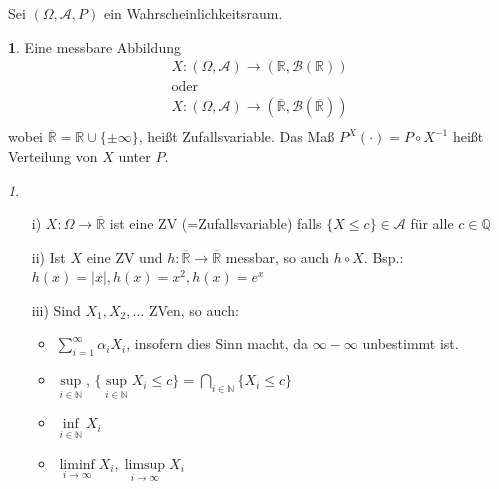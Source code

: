 \documentclass[10pt,a4paper]{report}
\numberwithin{equation}{section}
\numberwithin{figure}{section}
\theoremstyle{plain}
\theoremstyle{definition}
\newtheorem{defn}[thm]{\protect\definitionname}
\theoremstyle{remark}
\newtheorem{rem}[thm]{\protect\remarkname}
\theoremstyle{plain}
\providecommand{\definitionname}{Definition}
\providecommand{\remarkname}{Bemerkung}
\newcommand{\1}{ \mathbb{1} } %
\begin{document}
Sei $(\Omega,\mathcal{A},P)$ ein Wahrscheinlichkeitsraum.
\begin{defn}
  Eine messbare Abbildung
  \begin{eqnarray*}
    X:(\Omega,\mathcal{A}) \to (\mathbb{R},\mathcal{B}(\mathbb{R}))\\
    \text{oder}\\
    X:(\Omega,\mathcal{A}) \to (\overline{\mathbb{R}},\mathcal{B}(\overline{\mathbb{R}}))\\
  \end{eqnarray*}
  wobei $\overline{\mathbb{R}}=\mathbb{R}\cup\{\pm \infty \}$, heißt Zufallsvariable. Das Maß $P^X(\cdot)=P\circ X^{-1}$ heißt Verteilung von $X$ unter $P$.
\end{defn}
\begin{rem}
  \begin{itemize}
  \item[i)] $X: \Omega \to \overline{\mathbb{R}}$ ist eine ZV (=Zufallsvariable) falls $\{X\leq c\} \in \mathcal{A}$ für alle $c \in \mathbb{Q}$
  \item[ii)] Ist $X$ eine ZV und $h:\overline{\mathbb{R}} \to \overline{\mathbb{R}}$ messbar, so auch $h\circ X$. Bsp.:$h(x)=|x|, h(x)=x^2, h(x)=e^x$
  \item[iii)] Sind $X_1,X_2,\dots$ ZVen, so auch:
    \begin{itemize}
    \item $\sum\limits_{i=1}^\infty \alpha_i X_i$, insofern dies Sinn
      macht, da $\infty-\infty$ unbestimmt ist.
    \item $\sup\limits_{i\in \mathbb{N}}$, $\{\sup\limits_{i \in
        \mathbb{N}} X_i \leq c\}=\bigcap\limits_{i \in
        \mathbb{N}}\{X_i \leq c\}$
    \item $\inf\limits_{i \in \mathbb{N}} X_i$
    \item $\liminf\limits_{i \to \infty} X_i, \limsup\limits_{i \to
        \infty} X_i$
    \end{itemize}
  \end{itemize}
  $ $
\end{rem}
\end{document}
